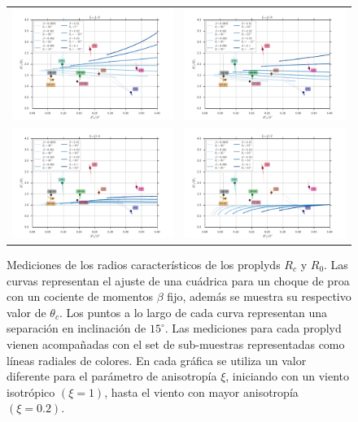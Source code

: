 \begin{figure}
\begin{tabular}{cc}
\includegraphics[width=0.48\linewidth]{./Figures/conic_xi-10} & \includegraphics[width=0.48\linewidth]{./Figures/conic_xi-08} \\
\includegraphics[width=0.48\linewidth]{./Figures/conic_xi-04} & \includegraphics[width=0.48\linewidth]{./Figures/conic_xi-02} 
\end{tabular}
\caption{Mediciones de los radios característicos de los proplyds $R_c$ y $R_0$. Las curvas representan el ajuste de una cuádrica para un choque de proa con un cociente de momentos $\beta$ fijo, además se muestra su respectivo valor de $\theta_c$. Los puntos a lo largo de cada curva representan una separación en inclinación de $15^\circ$. Las mediciones para cada proplyd vienen acompañadas con el set de sub-muestras representadas como líneas radiales de colores. En cada gráfica se utiliza un valor diferente para el parámetro de anisotropía $\xi$, iniciando con un viento isotrópico $(\xi=1)$, hasta el viento  con mayor anisotropía $(\xi=0.2)$.}
\label{fig:conic-xi}
\end{figure}

